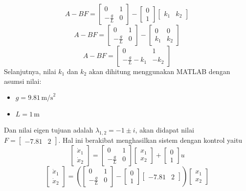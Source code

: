 \documentclass{article}
\begin{document}
\[
    A - BF =
    \begin{bmatrix}
        0            & 1 \\
        -\frac{g}{L} & 0
    \end{bmatrix} - \begin{bmatrix}
        0 \\ 1
    \end{bmatrix}
    \begin{bmatrix}
        k_1 & k_2
    \end{bmatrix}
\]
\[A - BF =
    \begin{bmatrix}
        0            & 1 \\
        -\frac{g}{L} & 0
    \end{bmatrix} - \begin{bmatrix}
        0   & 0   \\
        k_1 & k_2
    \end{bmatrix}
\]
\[ A - BF=
    \begin{bmatrix}
        0                  & 1    \\
        -\frac{g}{L} - k_1 & -k_2
    \end{bmatrix}
\]
Selanjutnya, nilai $k_1$ dan $k_2$ akan dihitung menggunakan MATLAB dengan asumsi nilai:
\begin{itemize}
    \item $g = 9.81 \, \text{m/s}^2$
    \item $L = 1 \, \text{m}$
\end{itemize}
Dan nilai eigen tujuan adalah ${\lambda}_{1,2}= -1 \pm i$, akan didapat nilai $F = \begin{bmatrix}
        -7.81 & 2
    \end{bmatrix}$.
Hal ini berakibat menghasilkan sistem dengan kontrol yaitu
\[
    \begin{bmatrix} \dot{x}_1 \\ \dot{x}_2 \end{bmatrix} =
    \begin{bmatrix} 0 & 1 \\ -\frac{g}{L} & 0 \end{bmatrix}
    \begin{bmatrix} x_1 \\ x_2 \end{bmatrix} +
    \begin{bmatrix} 0 \\ 1 \end{bmatrix} u
\]
\[
    \begin{bmatrix} \dot{x}_1 \\ \dot{x}_2 \end{bmatrix} =
    \left(
    \begin{bmatrix} 0 & 1 \\ -\frac{g}{L} & 0 \end{bmatrix}
    -
    \begin{bmatrix} 0 \\ 1 \end{bmatrix}
    \begin{bmatrix} -7.81 & 2 \end{bmatrix}
    \right)
    \begin{bmatrix} x_1 \\ x_2 \end{bmatrix}
\]
\end{document}
